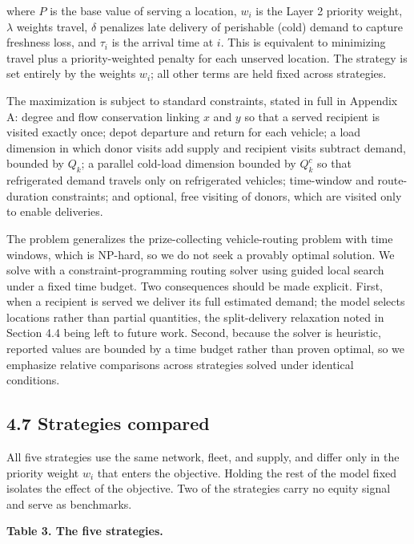\documentclass[
  11pt,
]{article}
\begin{document}
where \(P\) is the base value of serving a location, \(w_i\) is the
Layer 2 priority weight, \(\lambda\) weights travel, \(\delta\)
penalizes late delivery of perishable (cold) demand to capture freshness
loss, and \(\tau_i\) is the arrival time at \(i\). This is equivalent to
minimizing travel plus a priority-weighted penalty for each unserved
location. The strategy is set entirely by the weights \(w_i\); all other
terms are held fixed across strategies.

The maximization is subject to standard constraints, stated in full in
Appendix A: degree and flow conservation linking \(x\) and \(y\) so that
a served recipient is visited exactly once; depot departure and return
for each vehicle; a load dimension in which donor visits add supply and
recipient visits subtract demand, bounded by \(Q_k\); a parallel
cold-load dimension bounded by \(Q^{c}_k\) so that refrigerated demand
travels only on refrigerated vehicles; time-window and route-duration
constraints; and optional, free visiting of donors, which are visited
only to enable deliveries.

The problem generalizes the prize-collecting vehicle-routing problem
with time windows, which is NP-hard, so we do not seek a provably
optimal solution. We solve with a constraint-programming routing solver
using guided local search under a fixed time budget. Two consequences
should be made explicit. First, when a recipient is served we deliver
its full estimated demand; the model selects locations rather than
partial quantities, the split-delivery relaxation noted in Section 4.4
being left to future work. Second, because the solver is heuristic,
reported values are bounded by a time budget rather than proven optimal,
so we emphasize relative comparisons across strategies solved under
identical conditions.

\subsection{4.7 Strategies compared}\label{strategies-compared}

All five strategies use the same network, fleet, and supply, and differ
only in the priority weight \(w_i\) that enters the objective. Holding
the rest of the model fixed isolates the effect of the objective. Two of
the strategies carry no equity signal and serve as benchmarks.

\textbf{Table 3. The five strategies.}
\end{document}
